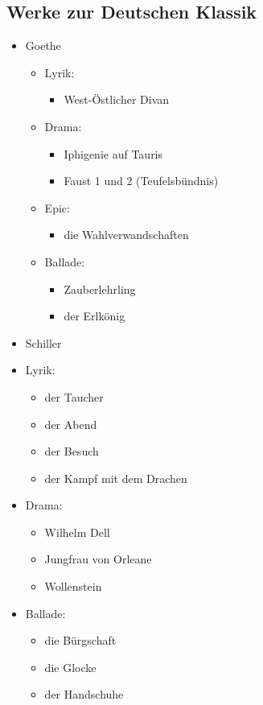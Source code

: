 \documentclass[12pt,a4paper]{article}
\begin{document}
\subsection{Werke zur Deutschen Klassik}

\begin{itemize}

\item Goethe
	\begin{itemize}
		\item Lyrik:
			\begin{itemize}
			\item West-Östlicher Divan
			\end{itemize}					
				
		\item Drama:
			\begin{itemize}
			\item Iphigenie auf Tauris
			\item Faust 1 und 2 (Teufelsbündnis)
			\end{itemize}
			
		\item Epic:
			\begin{itemize}
			\item die Wahlverwandschaften
			\end{itemize}
			
		\item Ballade:
			\begin{itemize}
			\item Zauberlehrling
			\item der Erlkönig
			\end{itemize}
	\end{itemize}
	
\item Schiller
		\item Lyrik:
			\begin{itemize}
			\item der Taucher
			\item der Abend
			\item der Besuch
			\item der Kampf mit dem Drachen
			\end{itemize}					
				
		\item Drama:
			\begin{itemize}
			\item Wilhelm Dell
			\item Jungfrau von Orleane
			\item Wollenstein
			\end{itemize}
			
		\item Ballade:
			\begin{itemize}
			\item die Bürgschaft
			\item die Glocke
			\item der Handschuhe
			\end{itemize}
\end{itemize}
\end{document}
